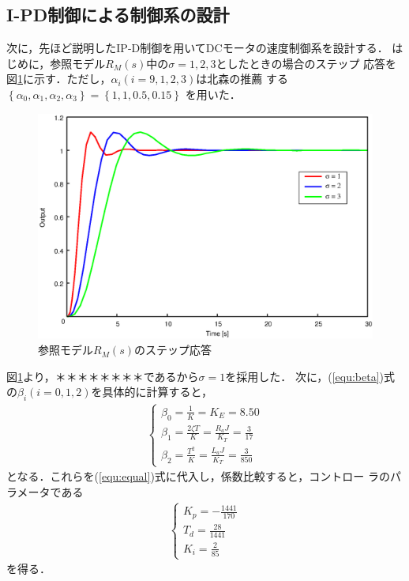 \documentclass[a4paper,12pt]{jarticle}
\begin{document}
\subsection{I-PD制御による制御系の設計}
次に，先ほど説明したIP-D制御を用いてDCモータの速度制御系を設計する．
はじめに，参照モデル$R_M(s)$中の$\sigma=1,2,3$としたときの場合のステップ
応答を図\ref{fig:IPDr}に示す．ただし，$\alpha_i(i=9,1,2,3)$は北森の推薦
する
$\left\{\alpha_0,\alpha_1,\alpha_2,\alpha_3\right\}=\left\{1,1,0.5,0.15\right\}$
を用いた．
%
\begin{figure}[tbp]
 \begin{center}
  \includegraphics[width = 150mm]{fig/IPDr.eps}
 \end{center}
 \caption{参照モデル$R_M(s)$のステップ応答}
 \label{fig:IPDr}
\end{figure}
%
図\ref{fig:IPDr}より，＊＊＊＊＊＊＊＊であるから$\sigma=1$を採用した．
次に，(\ref{equ:beta})式の$\beta_i(i=0,1,2)$を具体的に計算すると，
%
\begin{eqnarray}
 \begin{cases}
  \beta_0  =  \frac{1}{K} = K_E = 8.50 \\
  \beta_1  =  \frac{2\zeta T}{K} = \frac{R_a J}{K_T} = \frac{3}{17} \\
  \beta_2  =  \frac{T^2}{K} = \frac{L_a J}{K_T} = \frac{3}{850}
 \end{cases}
\end{eqnarray}
%
となる．これらを(\ref{equ:equal})式に代入し，係数比較すると，コントロー
ラのパラメータである
%
\begin{eqnarray}
 \begin{cases}
  K_p = -\frac{1441}{170} \\
  T_d = \frac{28}{1441} \\
  K_i = \frac{2}{85}
 \end{cases}
\end{eqnarray}
%
を得る．
%
\end{document}
